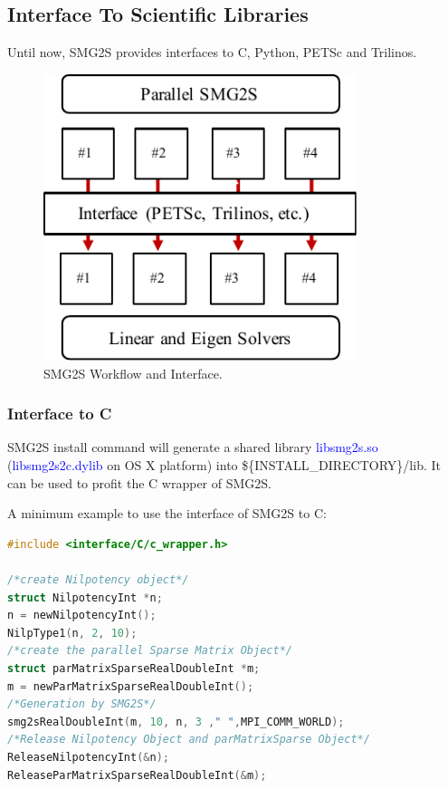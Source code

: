 \subsection{Interface To Scientific Libraries}

Until now, SMG2S provides interfaces to C, Python, PETSc and Trilinos.

\begin{figure}[htbp]
	\centering
	\includegraphics[width=3.6in]{fig/interface.pdf}
	\caption{SMG2S Workflow and Interface.}
	\label{fig:interface}
\end{figure}

\subsubsection{Interface to C}
SMG2S install command will generate a shared library \textcolor{blue}{libsmg2s.so} (\textcolor{blue}{libsmg2s2c.dylib} on OS X platform) into \$\{INSTALL\_DIRECTORY\}/lib. It can be used to profit the C wrapper of SMG2S. 

A minimum example to use the interface of SMG2S to C:

\begin{lstlisting}[language=C,frame=single]
#include <interface/C/c_wrapper.h>

/*create Nilpotency object*/
struct NilpotencyInt *n;
n = newNilpotencyInt();
NilpType1(n, 2, 10);
/*create the parallel Sparse Matrix Object*/
struct parMatrixSparseRealDoubleInt *m;
m = newParMatrixSparseRealDoubleInt();
/*Generation by SMG2S*/
smg2sRealDoubleInt(m, 10, n, 3 ," ",MPI_COMM_WORLD);
/*Release Nilpotency Object and parMatrixSparse Object*/
ReleaseNilpotencyInt(&n);
ReleaseParMatrixSparseRealDoubleInt(&m);
\end{lstlisting}

